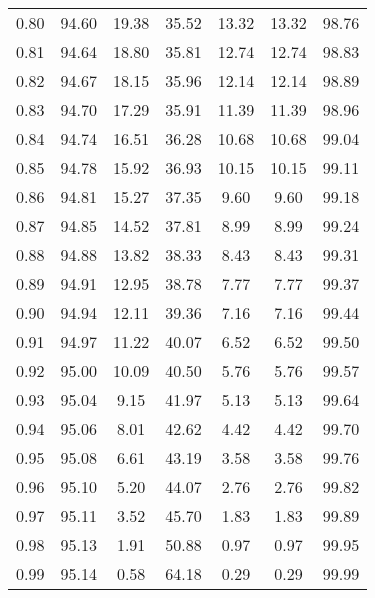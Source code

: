 \begin{tabular}{|c|c|c|c|c|c|c|}
      0.80 &     94.60 &     19.38 &      35.52 &   13.32 &      13.32 &         98.76 \\
      0.81 &     94.64 &     18.80 &      35.81 &   12.74 &      12.74 &         98.83 \\
      0.82 &     94.67 &     18.15 &      35.96 &   12.14 &      12.14 &         98.89 \\
      0.83 &     94.70 &     17.29 &      35.91 &   11.39 &      11.39 &         98.96 \\
      0.84 &     94.74 &     16.51 &      36.28 &   10.68 &      10.68 &         99.04 \\
      0.85 &     94.78 &     15.92 &      36.93 &   10.15 &      10.15 &         99.11 \\
      0.86 &     94.81 &     15.27 &      37.35 &    9.60 &       9.60 &         99.18 \\
      0.87 &     94.85 &     14.52 &      37.81 &    8.99 &       8.99 &         99.24 \\
      0.88 &     94.88 &     13.82 &      38.33 &    8.43 &       8.43 &         99.31 \\
      0.89 &     94.91 &     12.95 &      38.78 &    7.77 &       7.77 &         99.37 \\
      0.90 &     94.94 &     12.11 &      39.36 &    7.16 &       7.16 &         99.44 \\
      0.91 &     94.97 &     11.22 &      40.07 &    6.52 &       6.52 &         99.50 \\
      0.92 &     95.00 &     10.09 &      40.50 &    5.76 &       5.76 &         99.57 \\
      0.93 &     95.04 &      9.15 &      41.97 &    5.13 &       5.13 &         99.64 \\
      0.94 &     95.06 &      8.01 &      42.62 &    4.42 &       4.42 &         99.70 \\
      0.95 &     95.08 &      6.61 &      43.19 &    3.58 &       3.58 &         99.76 \\
      0.96 &     95.10 &      5.20 &      44.07 &    2.76 &       2.76 &         99.82 \\
      0.97 &     95.11 &      3.52 &      45.70 &    1.83 &       1.83 &         99.89 \\
      0.98 &     95.13 &      1.91 &      50.88 &    0.97 &       0.97 &         99.95 \\
      0.99 &     95.14 &      0.58 &      64.18 &    0.29 &       0.29 &         99.99 \\
\bottomrule
\end{tabular}
